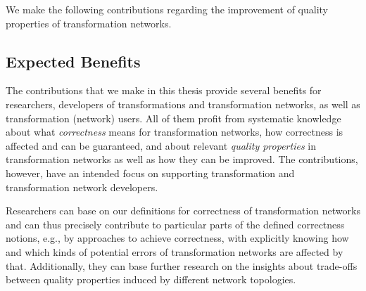 We make the following contributions regarding the improvement of quality properties of transformation networks.
\begin{contributions}
    \begin{integrationcontribution}
    \end{integrationcontribution}
\end{contributions}


\subsection{Expected Benefits}

The contributions that we make in this thesis provide several benefits for researchers, developers of transformations and transformation networks, as well as transformation (network) users.
All of them profit from systematic knowledge about what \emph{correctness} means for transformation networks, how correctness is affected and can be guaranteed, and about relevant \emph{quality properties} in transformation networks as well as how they can be improved.
The contributions, however, have an intended focus on supporting transformation and transformation network developers. 

Researchers can base on our definitions for correctness of transformation networks and can thus precisely contribute to particular parts of the defined correctness notions, e.g., by approaches to achieve correctness, with explicitly knowing how and which kinds of potential errors of transformation networks are affected by that.
Additionally, they can base further research on the insights about trade-offs between quality properties induced by different network topologies.

